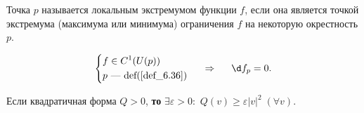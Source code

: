 \begin{to_def}
	Точка $p$ называется локальным экстремумом функции $f$, если она является точкой экстремума (максимума или минимума) ограничения $f$ на некоторую окрестность $p$.
	\label{def_6.36}
\end{to_def}

\begin{to_thr}
	\begin{equation*}
		\left\{\begin{aligned}
	    	&f \in C^1(U(p))\\
	    	&p \text{ --- def(\ref{def_6.36})}
		\end{aligned} \right.
		\hspace*{0.5 cm} \Rightarrow \hspace*{0.5 cm}
		\d f_p = 0.
	\end{equation*}
	\label{thr_6.37}
\end{to_thr}

\begin{to_lem}
	Если квадратичная форма $Q > 0$, \textbf{то} $\exists \varepsilon>0 \colon $ $Q(v) \geq \varepsilon|v|^2 \;(\forall v)$.
	\label{lem_6.38}
\end{to_lem}
